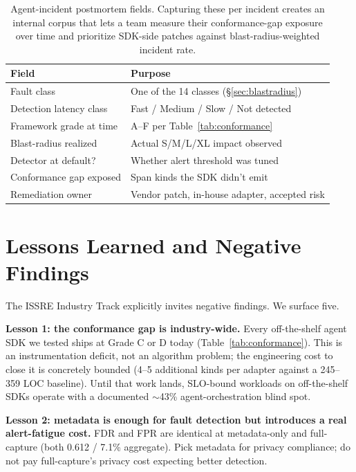 \documentclass[conference]{IEEEtran}
\begin{document}
\begin{table}[t]
\centering
\scriptsize
\caption{Agent-incident postmortem fields. Capturing these per
incident creates an internal corpus that lets a team measure
their conformance-gap exposure over time and prioritize SDK-side
patches against blast-radius-weighted incident rate.}
\label{tab:postmortem}
\begin{tabular}{@{}lp{4.8cm}@{}}
\toprule
\textbf{Field} & \textbf{Purpose} \\
\midrule
Fault class & One of the 14 classes (\S\ref{sec:blastradius}) \\
Detection latency class & Fast / Medium / Slow / Not detected \\
Framework grade at time & A--F per Table~\ref{tab:conformance} \\
Blast-radius realized & Actual S/M/L/XL impact observed \\
Detector at default? & Whether alert threshold was tuned \\
Conformance gap exposed & Span kinds the SDK didn't emit \\
Remediation owner & Vendor patch, in-house adapter, accepted risk \\
\bottomrule
\end{tabular}
\end{table}

\section{Lessons Learned and Negative Findings}
\label{sec:lessons}

The ISSRE Industry Track explicitly invites negative findings. We
surface five.

\textbf{Lesson 1: the conformance gap is industry-wide.} Every
off-the-shelf agent SDK we tested ships at Grade C or D today
(Table~\ref{tab:conformance}). This is an instrumentation deficit,
not an algorithm problem; the engineering cost to close it is
concretely bounded (4--5 additional kinds per adapter against a
245--359 LOC baseline). Until that work lands, SLO-bound workloads
on off-the-shelf SDKs operate with a documented $\sim$43\%
agent-orchestration blind spot.

\textbf{Lesson 2: metadata is enough for fault detection but
introduces a real alert-fatigue cost.} FDR and FPR are identical at
metadata-only and full-capture (both 0.612 / 7.1\% aggregate). Pick
metadata for privacy compliance; do not pay full-capture's privacy
cost expecting better detection.
\end{document}
